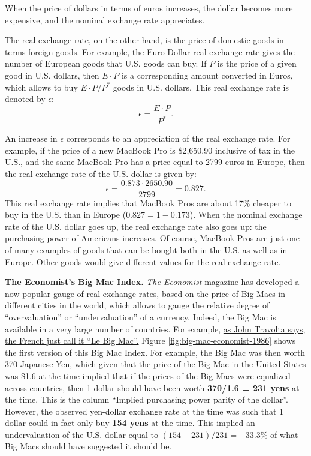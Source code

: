\documentclass[]{book}
\begin{document}
When the price of dollars in terms of euros increases, the dollar
becomes more expensive, and the nominal exchange rate appreciates.

The real exchange rate, on the other hand, is the price of domestic
goods in terms foreign goods. For example, the Euro-Dollar real exchange
rate gives the number of European goods that U.S. goods can buy. If
\(P\) is the price of a given good in U.S. dollars, then \(E \cdot P\)
is a corresponding amount converted in Euros, which allows to buy
\(E \cdot P/P^{*}\) goods in U.S. dollars. This real exchange rate is
denoted by \(\epsilon\): \[\epsilon=\frac{E \cdot P}{P^{*}}.\]

An increase in \(\epsilon\) corresponds to an appreciation of the real
exchange rate. For example, if the price of a new MacBook Pro is
\$2,650.90 inclusive of tax in the U.S., and the same MacBook Pro has a
price equal to 2799 euros in Europe, then the real exchange rate of the
U.S. dollar is given by:
\[\epsilon = \frac{0.873 \cdot 2650.90}{2799}=0.827.\] This real
exchange rate implies that MacBook Pros are about 17\% cheaper to buy in
the U.S. than in Europe (\(0.827 = 1-0.173\)). When the nominal exchange
rate of the U.S. dollar goes up, the real exchange rate also goes up:
the purchasing power of Americans increases. Of course, MacBook Pros are
just one of many examples of goods that can be bought both in the U.S.
as well as in Europe. Other goods would give different values for the
real exchange rate.

\textbf{The Economist's Big Mac Index.} \emph{The Economist} magazine
has developed a now popular gauge of real exchange rates, based on the
price of Big Macs in different cities in the world, which allows to
gauge the relative degree of ``overvaluation'' or ``undervaluation'' of
a currency. Indeed, the Big Mac is available in a very large number of
countries. For example,
\href{https://www.youtube.com/watch?v=PxXhjFvNNGc}{as John Travolta
says, the French just call it ``Le Big Mac''.} Figure
\ref{fig:big-mac-economist-1986} shows the first version of this Big Mac
Index. For example, the Big Mac was then worth 370 Japanese Yen, which
given that the price of the Big Mac in the United States was \$1.6 at
the time implied that if the prices of the Big Macs were equalized
across countries, then 1 dollar should have been worth \textbf{370/1.6 =
231 yens} at the time. This is the column ``Implied purchasing power
parity of the dollar''. However, the observed yen-dollar exchange rate
at the time was such that 1 dollar could in fact only buy \textbf{154
yens} at the time. This implied an undervaluation of the U.S. dollar
equal to \((154-231)/231=-33.3\)\% of what Big Macs should have
suggested it should be.
\end{document}
